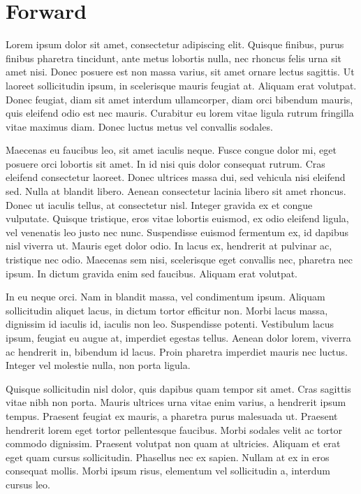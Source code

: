 






\section{Forward}

Lorem ipsum dolor sit amet, consectetur adipiscing elit. Quisque finibus, purus finibus pharetra tincidunt, ante metus lobortis nulla, nec rhoncus felis urna sit amet nisi. Donec posuere est non massa varius, sit amet ornare lectus sagittis. Ut laoreet sollicitudin ipsum, in scelerisque mauris feugiat at. Aliquam erat volutpat. Donec feugiat, diam sit amet interdum ullamcorper, diam orci bibendum mauris, quis eleifend odio est nec mauris. Curabitur eu lorem vitae ligula rutrum fringilla vitae maximus diam. Donec luctus metus vel convallis sodales.

Maecenas eu faucibus leo, sit amet iaculis neque. Fusce congue dolor mi, eget posuere orci lobortis sit amet. In id nisi quis dolor consequat rutrum. Cras eleifend consectetur laoreet. Donec ultrices massa dui, sed vehicula nisi eleifend sed. Nulla at blandit libero. Aenean consectetur lacinia libero sit amet rhoncus. Donec ut iaculis tellus, at consectetur nisl. Integer gravida ex et congue vulputate. Quisque tristique, eros vitae lobortis euismod, ex odio eleifend ligula, vel venenatis leo justo nec nunc. Suspendisse euismod fermentum ex, id dapibus nisl viverra ut. Mauris eget dolor odio. In lacus ex, hendrerit at pulvinar ac, tristique nec odio. Maecenas sem nisi, scelerisque eget convallis nec, pharetra nec ipsum. In dictum gravida enim sed faucibus. Aliquam erat volutpat.

In eu neque orci. Nam in blandit massa, vel condimentum ipsum. Aliquam sollicitudin aliquet lacus, in dictum tortor efficitur non. Morbi lacus massa, dignissim id iaculis id, iaculis non leo. Suspendisse potenti. Vestibulum lacus ipsum, feugiat eu augue at, imperdiet egestas tellus. Aenean dolor lorem, viverra ac hendrerit in, bibendum id lacus. Proin pharetra imperdiet mauris nec luctus. Integer vel molestie nulla, non porta ligula.

Quisque sollicitudin nisl dolor, quis dapibus quam tempor sit amet. Cras sagittis vitae nibh non porta. Mauris ultrices urna vitae enim varius, a hendrerit ipsum tempus. Praesent feugiat ex mauris, a pharetra purus malesuada ut. Praesent hendrerit lorem eget tortor pellentesque faucibus. Morbi sodales velit ac tortor commodo dignissim. Praesent volutpat non quam at ultricies. Aliquam et erat eget quam cursus sollicitudin. Phasellus nec ex sapien. Nullam at ex in eros consequat mollis. Morbi ipsum risus, elementum vel sollicitudin a, interdum cursus leo.

